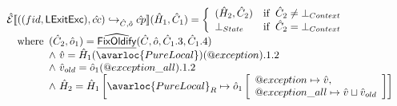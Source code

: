 \[\begin{array}{l}
\aE \lbr ((fid,\SF{LExitExc}),\hat{cc}) \cfgnext_{\hat{C},\hat{o}} \acp \rbr (\hat{H}_1,\hat{C}_1) =
  \left\{
    \begin{array}{ll}
      (\hat{H}_2, \hat{C}_2) & \ifc{\hat{C}_2 \neq \bot_{Context}} \\
      \bot_{State} & \ifc{\hat{C}_2 = \bot_{Context}} \\
    \end{array}
  \right.\\
  \quad\wherec{
    (\hat{C}_2, \hat{o}_1) = \ahf{FixOldify}(\hat{C}, \hat{o}, \hat{C}_1.3, \hat{C}_1.4) \\ 
    \land\ \hat{v} = \hat{H}_1(\avarloc{PureLocal})(\varprop{exception}).1.2 \\
    \land\ \hat{v}_{old} = \hat{o}_1(\varprop{exception\_all}).1.2 \\
    \land\ \hat{H}_2 = \hat{H}_1\left[\avarloc{PureLocal}_R \mapsto \hat{o}_1
      \left[\begin{array}{l}
        \varprop{exception} \mapsto \hat{v}, \\
        \varprop{exception\_all} \mapsto \hat{v} \sqcup \hat{v}_{old}
      \end{array}\right]\right]
  }
\\\\

\end{array}
\]
